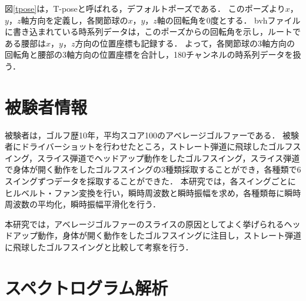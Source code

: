 図\ref{tpose}は，T-poseと呼ばれる，デフォルトポーズである．
このポーズより$x$，$y$，$z$軸方向を定義し，各関節球の$x$，$y$，$z$軸の回転角を0度とする．
bvhファイルに書き込まれている時系列データは，このポーズからの回転角を示し，ルートである腰部は$x$，$y$，$z$方向の位置座標も記録する．
よって，各関節球の3軸方向の回転角と腰部の3軸方向の位置座標を合計し，180チャンネルの時系列データを扱う．

\section{被験者情報}
被験者は，ゴルフ歴10年，平均スコア100のアベレージゴルファーである．
被験者にドライバーショットを行わせたところ，ストレート弾道に飛球したゴルフスイング，スライス弾道でヘッドアップ動作をしたゴルフスイング，スライス弾道で身体が開く動作をしたゴルフスイングの3種類採取することができ，各種類で6スイングずつデータを採取することができた．
本研究では，各スイングごとにヒルベルト・ファン変換を行い，瞬時周波数と瞬時振幅を求め，各種類毎に瞬時周波数の平均化，瞬時振幅平滑化を行う．

本研究では，アベレージゴルファーのスライスの原因としてよく挙げられるヘッドアップ動作，身体が開く動作をしたゴルフスイングに注目し，ストレート弾道に飛球したゴルフスイングと比較して考察を行う．

\section{スペクトログラム解析}
